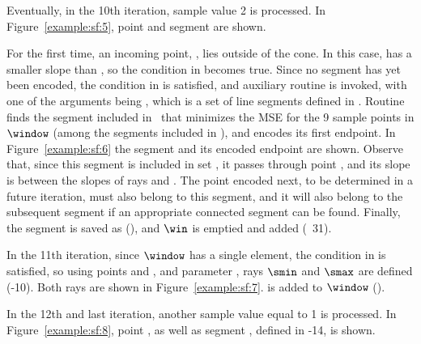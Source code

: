 \vspace{+5pt}


\clearpage


Eventually, in the 10th iteration, sample value 2 is processed. In Figure~\ref{example:sf:5}, point  and segment  are shown.




For the first time, an incoming point, , lies outside of the cone. In this case,  has a smaller slope than \smin, so the condition in  becomes true. Since no segment has yet been encoded, the condition in  is satisfied, and auxiliary routine \SFWinStart is invoked, with one of the arguments being \segmentSet, which is a set of line segments defined in . Routine \SFWinStart finds the segment included in \segmentSet\ that minimizes the MSE for the 9 sample points in $\window$ (among the segments included in \segmentSet), and encodes its first endpoint. In Figure~\ref{example:sf:6} the segment and its encoded endpoint are shown. Observe that, since this segment is included in set \segmentSet, it passes through point \interPoint, and its slope is between the slopes of rays \smin and \smax. The point encoded next, to be determined in a future iteration, must also belong to this segment, and it will also belong to the subsequent segment if an appropriate connected segment can be found. Finally, the segment is saved as \segmentLastT (), and $\win$ is emptied and added  (\Line~31).




\clearpage


In the 11th iteration, since $\window$ has a single element, the condition in  is satisfied, so using points \snapshot and , and parameter \maxerror, rays $\smin$ and $\smax$ are defined (-10). Both rays are shown in Figure~\ref{example:sf:7}.  is added to $\window$ (). 


\vspace{+5pt}


In the 12th and last iteration, another sample value equal to 1 is processed. In Figure~\ref{example:sf:8}, point , as well as segment , defined in -14, is shown.


\vspace{+5pt}


